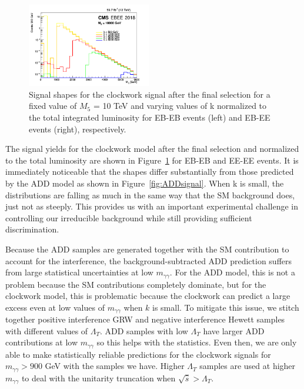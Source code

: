 \begin{figure}[tbp!]
\begin{center}
\includegraphics[angle=0,width=0.48\textwidth]{fig/2018EBEE.png}
\end{center}
\caption{Signal shapes for the clockwork signal after the final selection for a fixed value of $M_5$ = 10 TeV and varying values of k normalized to the total integrated luminosity for EB-EB events (left) and EB-EE events (right), respectively.}
\label{fig:CWSignal}
\end{figure}

The signal yields for the clockwork model after the final selection and normalized to the total luminosity are shown in Figure~\ref{fig:CWSignal} for EB-EB and EE-EE events. It is immediately noticeable that the shapes differ substantially from those predicted by the ADD model as shown in Figure~\ref{fig:ADDsignal}. When k is small, the distributions are falling as much in the same way that the SM background does, just not as steeply. This provides us with an important experimental challenge in controlling our irreducible background while still providing sufficient discrimination. 

Because the ADD samples are generated together with the SM contribution to account for the interference, the background-subtracted ADD prediction suffers from large statistical uncertainties at low $m_{\gamma\gamma}$. For the ADD model, this is not a problem because the SM contributions completely dominate, but for the clockwork model, this is problematic because the clockwork can predict a large excess even at low values of $m_{\gamma\gamma}$ when $k$ is small. To mitigate this issue, we stitch together positive interference GRW and negative interference Hewett samples with different values of $\Lambda_{T}$. ADD samples with low $\Lambda_{T}$ have larger ADD contributions at low $m_{\gamma\gamma}$ so this helps with the statistics. Even then, we are only able to make statistically reliable predictions for the clockwork signals for $m_{\gamma\gamma} > 900$ GeV with the samples we have. Higher $\Lambda_{T}$ samples are used at higher $m_{\gamma\gamma}$ to deal with the unitarity truncation when $\sqrt{\hat{s}} > \Lambda_{T}$. 

